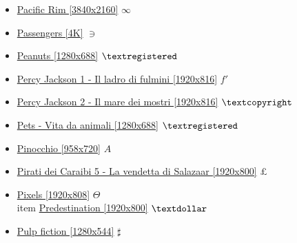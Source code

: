 		\begin{itemize}
			
			\item \href{https://mega.nz/#!gep3EQCS!hi8DQatM_VNsQmTkXuyZFsB1tlNKLeXqwVAy4AwsdPI} {Pacific Rim [3840x2160]}  $\infty$ \\ 
			\item \href{https://mega.nz/#!uHw0USrS!il2_UdMMXHqi8oJL1zY5fg8EWmAqEn1G5R_J30gYIlc} {Passengers [4K]}  $\ni$ \\ 
			\item \href{https://mega.nz/#!Ou4GgTjA!CWN7eSp4QapTeAtjeWpO5Rtiqdq1E_avVxF9tsAFHx8} {Peanuts [1280x688]}  $\textregistered$ \\ 
			\item \href{https://mega.nz/#!O7xDybJC!r68jegKKx0WarD8vb0xp7TOsIe0gnlsVnZNblva0FuU} {Percy Jackson 1 - Il ladro di fulmini [1920x816]}  $f'$ \\ 
			\item \href{https://mega.nz/#!HS5EXbCA!SQQsqBh-DNmPbUW0GwxTJ5FvFGnxXfm16vzPfjKbuCY} {Percy Jackson 2 - Il mare dei mostri [1920x816]}  $\textcopyright$ \\ 
			\item \href{https://mega.nz/#!z2px1a5J!oSL_GnCQkwCmSK-ixjN8O8oljmPjb1R9Krg4Yj10LCc} {Pets - Vita da animali [1280x688]}  $\textregistered$ \\ 
			\item \href{https://mega.nz/#!y8xRgZAA!ZIwqkxMlgN_tc_fsSpocB9tsCoNP2yNw_Y7ZWQ4oywY} {Pinocchio [958x720]}  $A$ \\ 
			\item \href{https://mega.nz/#!fyoERRwa!JTBS39CJWbBBbzjTsesvnrAWPpcJQnfCx0GVSnzKmiU} {Pirati dei Caraibi 5 - La vendetta di Salazaar [1920x800]}  $\pounds$ \\ 
			\item \href{https://mega.nz/#!XgwwGYrJ!sPL7CEcJ6zSF67a82l3B0eipMLHQE1e6OtoIkWLjLx8} {Pixels [1920x808]}  $\Theta$ \\ 
			item \href{https://mega.nz/#!OuAQxQYA!yKF5_hwJiwMczv_QEQzCgMq1a627Cwn6PXPqsx70DD0} {Predestination [1920x800]}  $\textdollar$ \\
			\item \href{https://mega.nz/#!F6JCTIIZ!uRc5NnciQpN197WW7HigqBH2VjvbN_piOy4KisIyKqM} {Pulp fiction [1280x544]}  $\sharp$ \\ 
				
	\end{itemize}	
		
